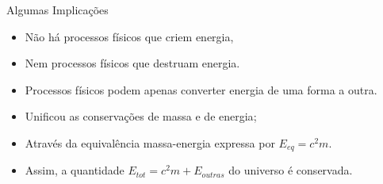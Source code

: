     \begin{frame}{Algumas Implicações}\vspace*{-2em}
        \begin{itemize}
            \item<1-> \alert{Não há processos físicos} que \alert{criem} energia,
                \\[\medskipamount]
            \item<2-> \alert{Nem processos físicos} que \alert{destruam} energia.
                \\[\medskipamount]
            \item<3-> \alert{Processos físicos} podem apenas \alert{converter} energia de uma
                forma a outra. \\[\medskipamount]
        \end{itemize}
        \begin{itemize}
            \item<4-> \alert{Unificou} as conservações de \alert{massa} e de \alert{energia};
                \\[\medskipamount]
            \item<5-> Através da \alert{equivalência massa-energia} expressa por $E_{eq} =
                c^2m$.  \\[\medskipamount]
            \item<6-> Assim, a quantidade $E_{tot} = c^2m + E_{outras}$ do universo é
                \alert{conservada}. %
        \end{itemize}
    \end{frame}

